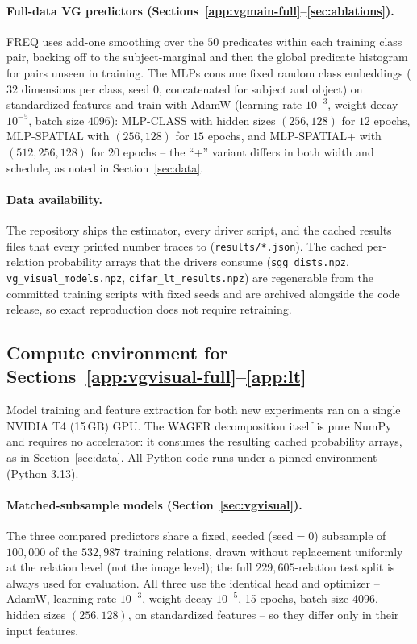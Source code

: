 \paragraph{Full-data VG predictors (Sections~\ref{app:vgmain-full}--\ref{sec:ablations}).}
FREQ uses add-one smoothing over the $50$ predicates within each training class pair,
backing off to the subject-marginal and then the global predicate histogram for pairs
unseen in training. The MLPs consume fixed random class embeddings
($32$ dimensions per class, seed $0$, concatenated for subject and object) on
standardized features and train with AdamW (learning rate $10^{-3}$, weight decay
$10^{-5}$, batch size $4096$): MLP-CLASS with hidden sizes $(256,128)$ for $12$ epochs,
MLP-SPATIAL with $(256,128)$ for $15$ epochs, and MLP-SPATIAL+ with $(512,256,128)$ for
$20$ epochs -- the ``+'' variant differs in both width and schedule, as noted in
Section~\ref{sec:data}.

\paragraph{Data availability.} The repository ships the estimator, every driver script,
and the cached results files that every printed number traces to
(\texttt{results/*.json}). The cached per-relation probability arrays that the drivers
consume (\texttt{sgg\_dists.npz}, \texttt{vg\_visual\_models.npz},
\texttt{cifar\_lt\_results.npz}) are regenerable from the committed training scripts
with fixed seeds and are archived alongside the code release, so exact reproduction
does not require retraining.

\subsection{Compute environment for Sections~\ref{app:vgvisual-full}--\ref{app:lt}}\label{app:compute}

Model training and feature extraction for both new experiments ran on a single NVIDIA
T4 (15\,GB) GPU. The WAGER decomposition itself is pure NumPy and requires no
accelerator: it consumes the resulting cached probability arrays, as in
Section~\ref{sec:data}. All Python code runs under a pinned environment (Python 3.13).

\paragraph{Matched-subsample models (Section~\ref{sec:vgvisual}).} The three compared
predictors share a fixed, seeded ($\text{seed}=0$) subsample of $100{,}000$ of the
$532{,}987$ training relations, drawn without replacement uniformly at the relation
level (not the image level); the full $229{,}605$-relation test split is always used for
evaluation. All three use the identical head and optimizer -- AdamW, learning rate
$10^{-3}$, weight decay $10^{-5}$, 15 epochs, batch size 4096, hidden sizes
$(256,128)$, on standardized features -- so they differ only in their input features.

